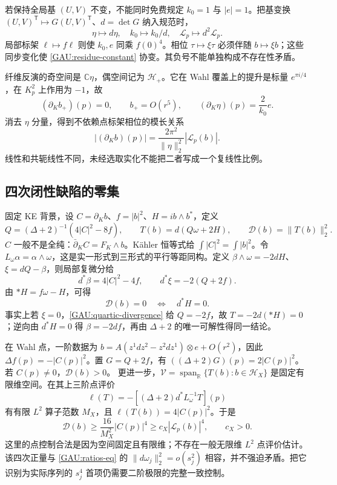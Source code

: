 \documentclass[UTF8,fontset=fandol,zihao=-4,oneside,openany]{ctexbook}
\theoremstyle{cjkplain}
\numberwithin{equation}{chapter}
\begin{document}
若保持全局基 $(U,V)$ 不变，不能同时免费规定 $k_0=1$ 与 $|e|=1$。把基变换 $(U,V)^\mathsf T\mapsto G(U,V)^\mathsf T$、$d=\det G$ 纳入规范时，
\[
\eta\mapsto d\eta,\quad k_0\mapsto k_0/d,\quad
\mathcal L_p\mapsto d^2\mathcal L_p.
\]
局部标架 $\ell\mapsto f\ell$ 则使 $k_0,e$ 同乘 $f(0)^4$。相位 $\tau\mapsto\xi\tau$ 必须伴随 $b\mapsto\xi b$；这些同步变化使 \eqref{GAU:residue-constant} 协变。其负号不能单独构成不存在性矛盾。

纤维反演的奇空间是 $\mathbb C\eta$，偶空间记为 $\mathcal H_+$。它在 Wahl 覆盖上的提升是标量 $e^{\pi i/4}$，在 $K_p^2$ 上作用为 $-1$，故
\[
(\partial_Kb_+)(p)=0,\qquad b_+=O(r^5),\qquad
(\partial_K\eta)(p)=\frac2{k_0}e.
\]
消去 $\eta$ 分量，得到不依赖点标架相位的模长关系
\begin{equation}\label{GAU:residue-curvature}
\boxed{|(\partial_Kb)(p)|=\frac{2\pi^2}{\|\eta\|_2^2}|\mathcal L_p(b)|.}
\end{equation}
线性和共轭线性不同，未经选取实化不能把二者写成一个复线性比例。

\subsection{四次闭性缺陷的零集}
固定 KE 背景，设 $C=\partial_Kb$、$f=|b|^2$、$H=i b\wedge b^*$，定义
\begin{equation}\label{GAU:quartic-definition}
Q=(\Delta+2)^{-1}(4|C|^2-8f),\qquad
T(b)=d(Q\omega+2H),\qquad\mathcal D(b)=\|T(b)\|_2^2.
\end{equation}
$C$ 一般不是全纯：$\bar\partial_KC=F_K\wedge b$。Kähler 恒等式给 $\int|C|^2=\int|b|^2$。令 $L_\omega\alpha=\alpha\wedge\omega$，这是实一形式到三形式的平行等距同构。定义 $\beta\wedge\omega=-2dH$、$\xi=dQ-\beta$，则局部复微分给
\begin{equation}\label{GAU:quartic-divergence}
d^*\beta=4|C|^2-4f,\qquad
d^*\xi=-2(Q+2f).
\end{equation}
由 $*H=f\omega-H$，可得
\begin{equation}\label{GAU:quartic-zero}
\boxed{\mathcal D(b)=0\quad\Longleftrightarrow\quad d^*H=0.}
\end{equation}
事实上若 $\xi=0$，\eqref{GAU:quartic-divergence} 给 $Q=-2f$，故 $T=-2d(*H)=0$；逆向由 $d^*H=0$ 得 $\beta=-2df$，再由 $\Delta+2$ 的唯一可解性得同一结论。

在 Wahl 点，一阶数据为
$b=A(z^1dz^2-z^2dz^1)\otimes e+O(r^2)$，因此
$\Delta f(p)=-|C(p)|^2$。置 $G=Q+2f$，有
$((\Delta+2)G)(p)=2|C(p)|^2$。若 $C(p)\ne0$，$\mathcal D(b)>0$。
更进一步，$\mathcal V=\operatorname{span}_{\mathbb R}\{T(b):b\in\mathcal H_X\}$ 是固定有限维空间。在其上三阶点评价
\[
\ell(T)=-[(\Delta+2)d^*L_\omega^{-1}T](p)
\]
有有限 $L^2$ 算子范数 $M_X$，且 $\ell(T(b))=4|C(p)|^2$。于是
\begin{equation}\label{GAU:quartic-lower}
\mathcal D(b)\ge\frac{16}{M_X^2}|C(p)|^4
\ge c_X|\mathcal L_p(b)|^4,\qquad c_X>0.
\end{equation}
这里的点控制合法是因为空间固定且有限维；不存在一般无限维 $L^2$ 点评价估计。该四次正量与 \eqref{GAU:ratios-eq} 的 $\|d\omega_j\|_2^2=o(s_j^2)$ 相容，并不强迫矛盾。把它识别为实际序列的 $s_j^4$ 首项仍需要二阶极限的完整一致控制。
\end{document}
